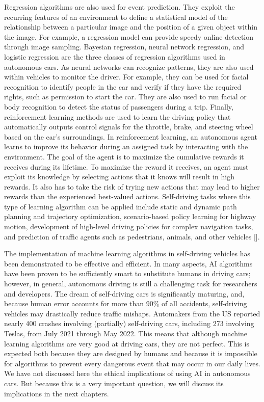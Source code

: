 Regression algorithms are also used for event prediction. They exploit the recurring features of an environment to define a statistical model of the relationship between a particular image and the position of a given object within the image. For example, a regression model can provide speedy online detection through image sampling. Bayesian regression, neural network regression, and logistic regression are the three classes of regression algorithms used in autonomous cars. As neural networks can recognize patterns, they are also used within vehicles to monitor the driver. For example, they can be used for facial recognition to identify people in the car and verify if they have the required rights, such as permission to start the car. They are also used to run facial or body recognition to detect the status of passengers during a trip. Finally, reinforcement learning methods are used to learn the driving policy that automatically outputs control signals for the throttle, brake, and steering wheel based on the car's surroundings. In reinforcement learning, an autonomous agent learns to improve its behavior during an assigned task by interacting with the environment. The goal of the agent is to maximize the cumulative rewards it receives during its lifetime. To maximize the reward it receives, an agent must exploit its knowledge by selecting actions that it knows will result in high rewards. It also has to take the risk of trying new actions that may lead to higher rewards than the experienced best-valued actions. Self-driving tasks where this type of learning algorithm can be applied include static and dynamic path planning and trajectory optimization, scenario-based policy learning for highway motion, development of high-level driving policies for complex navigation tasks, and prediction of traffic agents such as pedestrians, animals, and other vehicles [\citealt{chap:05:Kiranetal:2022}].

The implementation of machine learning algorithms in self-driving vehicles has been demonstrated to be effective and efficient. In many aspects, AI algorithms have been proven to be sufficiently smart to substitute humans in driving cars; however, in general, autonomous driving is still a challenging task for researchers and developers. The dream of self-driving cars is significantly maturing, and, because human error accounts for more than 90\% of all accidents, self-driving vehicles may drastically reduce traffic mishaps. Automakers from the US reported nearly 400 crashes involving (partially) self-driving cars, including 273 involving Teslas, from July 2021 through May 2022. This means that although machine learning algorithms are very good at driving cars, they are not perfect. This is expected both because they are designed by humans and because it is impossible for algorithms to prevent every dangerous event that may occur in our daily lives. We have not discussed here the ethical implications of using AI in autonomous cars. But because this is a very important question, we will discuss its implications in the next chapters.

